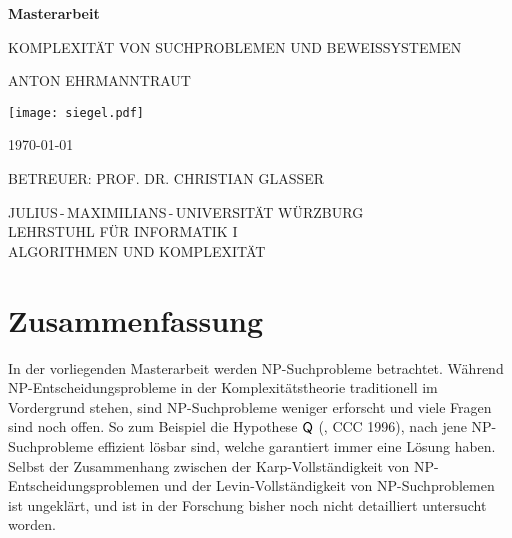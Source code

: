 \pagestyle{empty}

\begin{center}{

\vfill\sffamily

{\Large\textbf{Masterarbeit}}\par
    \vspace*{1cm}
{\huge{KOMPLEXITÄT VON SUCHPROBLEMEN UND BEWEISSYSTEMEN}}\par
    \vspace*{.3cm}
{\Large{ANTON EHRMANNTRAUT}}\par}
\vspace*{6cm}

\texttt{[image: siegel.pdf]}

\vspace*{4cm}


\bgroup\sffamily{}
{\large\MakeUppercase{\today}}\vspace*{.7cm}

{\large BETREUER: PROF. DR. CHRISTIAN GLASSER}\vspace*{.5cm}


{\large
JULIUS\,-\,MAXIMILIANS\,-\,UNIVERSITÄT WÜRZBURG\\
LEHRSTUHL FÜR INFORMATIK I\\
ALGORITHMEN UND KOMPLEXITÄT
}
\egroup


\end{center}

\cleardoublepage
\restoregeometry

\section*{Zusammenfassung}
In der vorliegenden Masterarbeit werden NP-Suchprobleme betrachtet. Während NP-Entscheidungsprobleme in der Komplexitätstheorie traditionell im Vordergrund stehen, sind NP-Suchprobleme weniger erforscht und viele Fragen sind noch offen.
So zum Beispiel die Hypothese $\mathsf{Q}$ (\citeauthor{fenner_inverting_1996}, CCC 1996), nach jene NP-Suchprobleme effizient lösbar sind, welche garantiert immer eine Lösung haben.
Selbst der Zusammenhang zwischen der Karp-Vollständigkeit von NP-Entscheidungsproblemen und der Levin-Vollständigkeit von NP-Suchproblemen ist ungeklärt, und ist in der Forschung bisher noch nicht detailliert untersucht worden.

